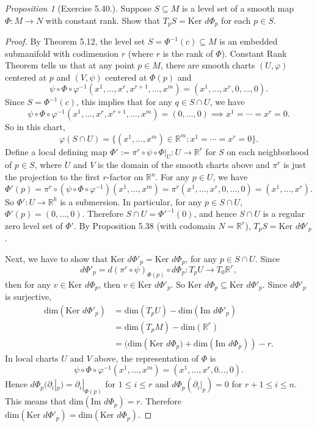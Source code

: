 \documentclass[a4paper]{article}
\theoremstyle{remark}
\newtheorem{prop}{Proposition}
\newcommand{\rk}{\mathbb{R}^k} %
\newcommand{\doo}{\partial}    %
\newcommand{\subhim}{\subseteq} %
\begin{document}
\begin{prop}[Exercise 5.40.] Suppose $S \subhim M$ is a level set of a smooth map $\Phi : M \to N$ with constant rank. Show that $T_pS = \text{Ker } d\Phi_p$ for each $p \in S$.
\end{prop}
\begin{proof}
	By Theorem 5.12, the level set $S= \Phi^{-1}(c) \subhim M$ is an embedded submanifold with codimension $r$ (where $r$ is the rank of $\Phi$). Constant Rank Theorem tells us that at any point $p \in M$, there are smooth charts $(U,\varphi)$ centered at $p$ and $(V,\psi)$ centered at $\Phi(p)$ and
	$$
	\psi \circ \Phi \circ \varphi^{-1} (x^1,\dots,x^r,x^{r+1},\dots,x^m) = (x^1,\dots,x^r,0,\dots,0).
	$$
	Since $S = \Phi^{-1}(c)$, this implies that for any $q \in S\cap U$, we have 
	$$
	\psi \circ \Phi \circ \varphi^{-1} (x^1,\dots,x^r,x^{r+1},\dots,x^m) = (0,\dots,0) \implies x^1=\cdots=x^r = 0.
	$$
	So in this chart, 
	$$
	\varphi(S\cap U) = \{(x^1,\dots,x^m) \in \mathbb{R}^m : x^1=\cdots=x^r=0\}.
	$$
	Define a local defining map $\Phi':=\pi^r \circ \psi \circ  \Phi|_U : U \to \mathbb{R}^r$ for $S$ on each neighborhood of $p\in S$,  where $U$ and $V$ is the domain of the smooth charts above and $\pi^r$ is just the projection to the first $r$-factor on $\mathbb{R}^n$. For any $p \in  U$, we have
	$$
	\Phi'(p) = \pi^r \circ (\psi \circ \Phi \circ \varphi^{-1})  (x^1,\dots,x^m) = \pi^r(x^1,\dots,x^r,0,\dots,0) = (x^1,\dots,x^r).
	$$    
	So $\Phi' : U \to \rk$ is a submersion. In particular, for any $p \in S\cap U$, $\Phi'(p) = (0,\dots,0)$. Therefore $S\cap U = \Phi'^{-1}(0)$, and hence $S\cap U$ is a regular zero level set of $\Phi'$. By Proposition 5.38 (with codomain $N=\mathbb{R}^r$), $T_pS = \text{Ker }d\Phi'_p$. 
	
	Next, we have to show that $\text{Ker }d\Phi'_p = \text{Ker }d\Phi_p$, for any $p \in S \cap U$. Since 
	$$
	d\Phi'_p = d(\pi^r \circ \psi)_{\Phi(p)} \circ d\Phi_p : T_pU \to T_0\mathbb{R}^r, 
	$$
	then for any $v \in \text{Ker }d\Phi_p $, then $v \in \text{Ker }d\Phi'_p$. So $\text{Ker }d\Phi_p \subseteq \text{Ker }d\Phi'_p$. Since $d\Phi'_p$ is surjective,
	\begin{align*}
	\text{dim} (\text{Ker }d\Phi'_p) &= \text{dim}(T_pU) - \text{dim} (\text{Im }d\Phi'_p) \\
	&=  \text{dim}(T_pM) -  \text{dim}(\mathbb{R}^r) \\ 
	&= \big(\text{dim}(\text{Ker }d\Phi_p\big) + \text{dim}(\text{Im }d\Phi_p)) - r .
	\end{align*}
	In local charts $U$ and $V$ above, the representation of $\Phi$ is
	$$
	\psi \circ \Phi \circ \varphi^{-1} (x^1,\dots,x^m) = (x^1,\dots,x^r,0\dots,0).
	$$
	Hence $d\Phi_p(\doo_i|_p) = \doo_i|_{\Phi(p)}$ for $1 \leq i \leq r$ and $d\Phi_p(\doo_i|_p) = 0$ for $r+1 \leq i \leq n$. This means that $\text{dim}(\text{Im }d\Phi_p) = r$. Therefore $\text{dim} (\text{Ker }d\Phi'_p) = \text{dim} (\text{Ker }d\Phi_p)$.
\end{proof}
\end{document}
